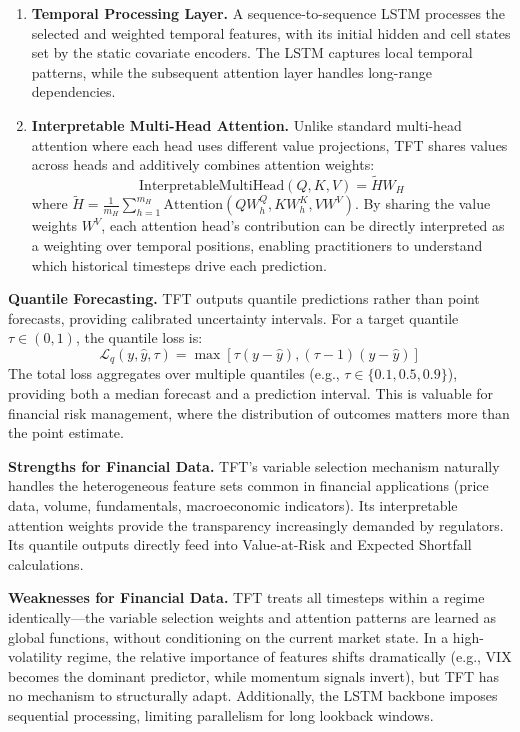 \documentclass[conference]{IEEEtran}
\begin{document}
\begin{enumerate}[nosep]
    \item \textbf{Temporal Processing Layer.} A sequence-to-sequence LSTM processes the selected and weighted temporal features, with its initial hidden and cell states set by the static covariate encoders. The LSTM captures local temporal patterns, while the subsequent attention layer handles long-range dependencies.

    \item \textbf{Interpretable Multi-Head Attention.} Unlike standard multi-head attention where each head uses different value projections, TFT shares values across heads and additively combines attention weights:
    \begin{equation}
    \text{InterpretableMultiHead}(Q, K, V) = \tilde{H} W_H
    \end{equation}
    where $\tilde{H} = \frac{1}{m_H} \sum_{h=1}^{m_H} \text{Attention}(Q W_h^Q, K W_h^K, V W^V)$. By sharing the value weights $W^V$, each attention head's contribution can be directly interpreted as a weighting over temporal positions, enabling practitioners to understand which historical timesteps drive each prediction.
\end{enumerate}

\textbf{Quantile Forecasting.} TFT outputs quantile predictions rather than point forecasts, providing calibrated uncertainty intervals. For a target quantile $\tau \in (0, 1)$, the quantile loss is:
\begin{equation}
\mathcal{L}_q(y, \hat{y}, \tau) = \max[\tau(y - \hat{y}), (\tau - 1)(y - \hat{y})]
\end{equation}
The total loss aggregates over multiple quantiles (e.g., $\tau \in \{0.1, 0.5, 0.9\}$), providing both a median forecast and a prediction interval. This is valuable for financial risk management, where the distribution of outcomes matters more than the point estimate.

\textbf{Strengths for Financial Data.} TFT's variable selection mechanism naturally handles the heterogeneous feature sets common in financial applications (price data, volume, fundamentals, macroeconomic indicators). Its interpretable attention weights provide the transparency increasingly demanded by regulators. Its quantile outputs directly feed into Value-at-Risk and Expected Shortfall calculations.

\textbf{Weaknesses for Financial Data.} TFT treats all timesteps within a regime identically---the variable selection weights and attention patterns are learned as global functions, without conditioning on the current market state. In a high-volatility regime, the relative importance of features shifts dramatically (e.g., VIX becomes the dominant predictor, while momentum signals invert), but TFT has no mechanism to structurally adapt. Additionally, the LSTM backbone imposes sequential processing, limiting parallelism for long lookback windows.
\end{document}
